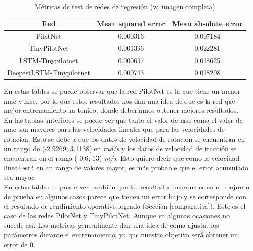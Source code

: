 \begin{table}[H]
\centering
\caption{Métricas de test de redes de regresión (w, imagen completa)}
\label{metricas_reg_completa_w}
\begin{tabular}{c|c|c|}
\cline{1-3}
                        \multicolumn{1}{|c|}{Red}    & Mean squared error       & Mean absolute error             \\ \hline
\multicolumn{1}{|c|}{PilotNet}    & 0.000316   & 0.007184    \\ \hline
\multicolumn{1}{|c|}{TinyPilotNet}     & 0.001366      & 0.022281   \\ \hline
\multicolumn{1}{|c|}{LSTM-Tinypilotnet}     & 0.000607    & 0.018625        \\ \hline
\multicolumn{1}{|c|}{DeepestLSTM-Tinypilotnet}     & 0.000743  & 0.018208        \\ \hline
\end{tabular}
\end{table}


En estas tablas se puede observar que la red PilotNet es la que tiene un menor \acrshort{mae} y \acrshort{mse}, por lo que estos resultados nos dan una idea de que es la red que mejor entrenamiento ha tenido, donde deberíamos obtener mejores resultados.\\

En las tablas anteriores se puede ver que tanto el valor de \acrshort{mse} como el valor de \acrshort{mae} son mayores para las velocidades lineales que para las velocidades de rotación. Esto se debe a que los datos de velocidad de rotación se encuentran en un rango de (-2.9269; 3.1138) en \textit{rad/s} y los datos de velocidad de tracción se encuentran en el rango (-0.6; 13) \textit{m/s}. Esto quiere decir que como la velocidad lineal está en un rango de valores mayor, es más probable que el error acumulado sea mayor.\\

En estas tablas se puede ver también que los resultados neuronales en el conjunto de prueba en algunos casos parece que tienen un error bajo y se corresponde con el resultado de rendimiento operativo logrado (Sección \ref{comparativa}). Este es el caso de las redes PilotNet y TinyPilotNet. Aunque en algunas ocasiones no sucede así. Las métricas generalmente dan una idea de cómo ajustar los parámetros durante el entrenamiento, ya que nuestro objetivo será obtener un error de 0.\\

